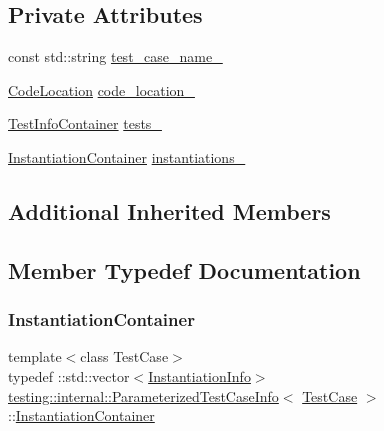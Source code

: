 \subsection*{Private Attributes}
\begin{DoxyCompactItemize}
\item 
const std\+::string \mbox{\hyperlink{classtesting_1_1internal_1_1_parameterized_test_case_info_a29b78b287552ba36a896e9352e86440c}{test\+\_\+case\+\_\+name\+\_\+}}
\item 
\mbox{\hyperlink{structtesting_1_1internal_1_1_code_location}{Code\+Location}} \mbox{\hyperlink{classtesting_1_1internal_1_1_parameterized_test_case_info_a7eb114d9580001f9cb978684dfa8e0ee}{code\+\_\+location\+\_\+}}
\item 
\mbox{\hyperlink{classtesting_1_1internal_1_1_parameterized_test_case_info_aeabb0c5fa88a11a0b9037167a57d6922}{Test\+Info\+Container}} \mbox{\hyperlink{classtesting_1_1internal_1_1_parameterized_test_case_info_a561fad516239cf6427df6915ba3182e9}{tests\+\_\+}}
\item 
\mbox{\hyperlink{classtesting_1_1internal_1_1_parameterized_test_case_info_acf93d7726e6d55e312ac89c51379110c}{Instantiation\+Container}} \mbox{\hyperlink{classtesting_1_1internal_1_1_parameterized_test_case_info_a2e86fd404a78daa1f1169bf689c4b3f4}{instantiations\+\_\+}}
\end{DoxyCompactItemize}
\subsection*{Additional Inherited Members}


\subsection{Member Typedef Documentation}
\mbox{\label{classtesting_1_1internal_1_1_parameterized_test_case_info_acf93d7726e6d55e312ac89c51379110c}} 
\subsubsection{\texorpdfstring{InstantiationContainer}{InstantiationContainer}}
{\footnotesize\ttfamily template$<$class Test\+Case$>$ \\
typedef \+::std\+::vector$<$\mbox{\hyperlink{structtesting_1_1internal_1_1_parameterized_test_case_info_1_1_instantiation_info}{Instantiation\+Info}}$>$ \mbox{\hyperlink{classtesting_1_1internal_1_1_parameterized_test_case_info}{testing\+::internal\+::\+Parameterized\+Test\+Case\+Info}}$<$ \mbox{\hyperlink{classtesting_1_1_test_case}{Test\+Case}} $>$\+::\mbox{\hyperlink{classtesting_1_1internal_1_1_parameterized_test_case_info_acf93d7726e6d55e312ac89c51379110c}{Instantiation\+Container}}\hspace{0.3cm}{\ttfamily [private]}}

